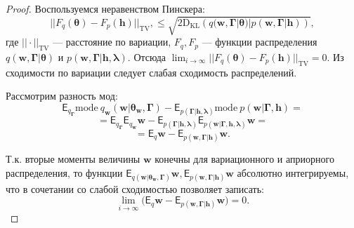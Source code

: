 \begin{proof}
Воспользуемся неравенством Пинскера:
\[
    ||F_q(\boldsymbol{\theta}) - F_p(\mathbf{h})||_\text{TV},\leq\sqrt{2\text{D}_\text{KL}\left(q(\mathbf{w}, \boldsymbol{\Gamma}|\boldsymbol{\theta})|p(\mathbf{w}, \boldsymbol{\Gamma}|\mathbf{h})\right)},
\]
где $||\cdot||_\text{TV}$ --- расстояние по вариации, $F_q, F_p$ --- функции распределения   $q(\mathbf{w},\boldsymbol{\Gamma}|\boldsymbol{\theta})$ и $p(\mathbf{w},\boldsymbol{\Gamma}| \mathbf{h}, \boldsymbol{\lambda})$.
Отсюда $ \lim_{i \to \infty} ||F_q(\boldsymbol{\theta}) - F_p(\mathbf{h})||_\text{TV} = 0.$
Из сходимости по вариации следует слабая сходимость распределений.

Рассмотрим разность мод:
\[
\mathsf{E}_{q_{\boldsymbol{\Gamma}}}\text{mode}~q_{\mathbf{w}}(\mathbf{w}|\boldsymbol{\theta}_\mathbf{w},\boldsymbol{\Gamma}) - \mathsf{E}_{p(\boldsymbol{\Gamma}|\mathbf{h}, \boldsymbol{\lambda})} \text{mode}~p(\mathbf{w}|\boldsymbol{\Gamma}, \mathbf{h}) = 
\]
\[
=\mathsf{E}_{q_{\boldsymbol{\Gamma}}} \mathsf{E}_{q_\mathbf{w}} \mathbf{w} - \mathsf{E}_{p(\boldsymbol{\Gamma}|\mathbf{h}, \boldsymbol{\lambda})} \mathsf{E}_{p(\mathbf{w}| \boldsymbol{\Gamma}, \mathbf{h}, \boldsymbol{\lambda})} \mathbf{w} =
\]
\[
= \mathsf{E}_{q}\mathbf{w} - \mathsf{E}_{p(\mathbf{w},\boldsymbol{\Gamma}|\mathbf{h})}\mathbf{w}.
\]

Т.к. вторые моменты величины $\mathbf{w}$ конечны для вариационного и априорного распределения, то функции $\mathsf{E}_{q(\mathbf{w}|\boldsymbol{\theta}_\mathbf{w},\boldsymbol{\Gamma})}\mathbf{w}, \mathsf{E}_{p(\mathbf{w},\boldsymbol{\Gamma}| \mathbf{h})}\mathbf{w}$ абсолютно интегрируемы, что в сочетании со слабой сходимостью позволяет записать:
\[
  \lim_{i \to \infty}\bigl( \mathsf{E}_{q}\mathbf{w} -  \mathsf{E}_{p(\mathbf{w},\boldsymbol{\Gamma}|\mathbf{h})}\mathbf{w} \bigr) = 0.
\]


\end{proof}
